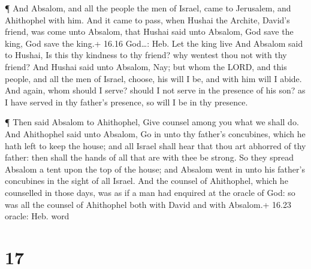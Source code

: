  ¶ And Absalom, and all the people the men of Israel, came
to Jerusalem, and Ahithophel with him.  And it came to
pass, when Hushai the Archite, David's friend, was come unto Absalom,
that Hushai said unto Absalom, God save the king, God save the king.+
16.16 God\ldots: Heb. Let the king live  And Absalom said
to Hushai, Is this thy kindness to thy friend? why wentest thou not with
thy friend?  And Hushai said unto Absalom, Nay; but whom
the LORD, and this people, and all the men of Israel, choose, his will I
be, and with him will I abide.  And again, whom should I
serve? should I not serve in the presence of his son? as I have served
in thy father's presence, so will I be in thy presence.

 ¶ Then said Absalom to Ahithophel, Give counsel among you
what we shall do.  And Ahithophel said unto Absalom, Go in
unto thy father's concubines, which he hath left to keep the house; and
all Israel shall hear that thou art abhorred of thy father: then shall
the hands of all that are with thee be strong.  So they
spread Absalom a tent upon the top of the house; and Absalom went in
unto his father's concubines in the sight of all Israel. 
And the counsel of Ahithophel, which he counselled in those days, was as
if a man had enquired at the oracle of God: so was all the counsel of
Ahithophel both with David and with Absalom.+ 16.23 oracle: Heb. word

\hypertarget{section-16}{%
\section{17}\label{section-16}}

